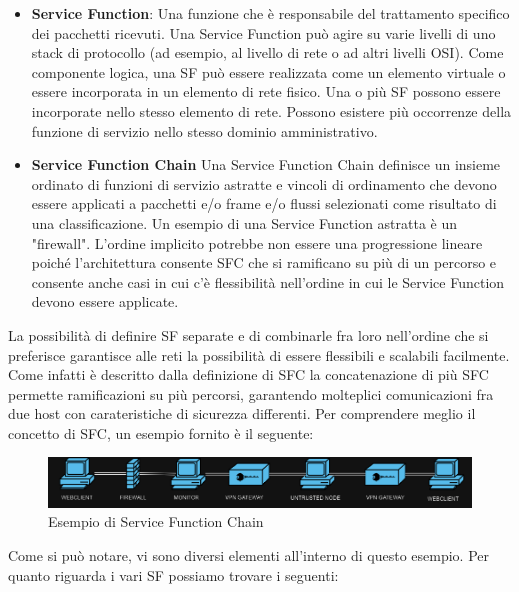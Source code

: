 \begin{itemize}
    \item \textbf{Service Function}: Una funzione che è responsabile del trattamento specifico dei pacchetti ricevuti. Una Service Function può agire su varie livelli di uno stack di protocollo (ad esempio, al livello di rete o ad altri livelli OSI). 
    Come componente logica, una SF può essere realizzata come un elemento virtuale o essere incorporata in un elemento di rete fisico.
     Una o più SF possono essere incorporate nello stesso elemento di rete. Possono esistere più occorrenze della funzione di servizio nello stesso dominio amministrativo.
    \item \textbf{Service Function Chain} Una Service Function Chain definisce un insieme ordinato di funzioni di servizio astratte e vincoli di ordinamento che devono essere applicati a pacchetti e/o frame e/o flussi selezionati come risultato di una classificazione. 
    Un esempio di una Service Function astratta è un "firewall". 
    L'ordine implicito potrebbe non essere una progressione lineare poiché l'architettura consente SFC che si ramificano su più di un percorso e consente anche casi in cui c'è flessibilità nell'ordine in cui le Service Function devono essere applicate. 
\end{itemize}

La possibilità di definire SF separate e di combinarle fra loro nell'ordine che si preferisce garantisce alle reti la possibilità di essere flessibili e scalabili facilmente.
Come infatti è descritto dalla definizione di SFC la concatenazione di più SFC permette ramificazioni su più percorsi, garantendo molteplici comunicazioni fra due host con carateristiche di sicurezza differenti.
Per comprendere meglio il concetto di SFC, un esempio fornito è il seguente:


\begin{figure}[h]  %
    \centering
    \includegraphics[width=1\textwidth]{SFC.png}  %
    \caption{Esempio di Service Function Chain}
    \label{fig:esempio}
  \end{figure}


Come si può notare, vi sono diversi elementi all'interno di questo esempio.
Per quanto riguarda i vari SF possiamo trovare i seguenti:

